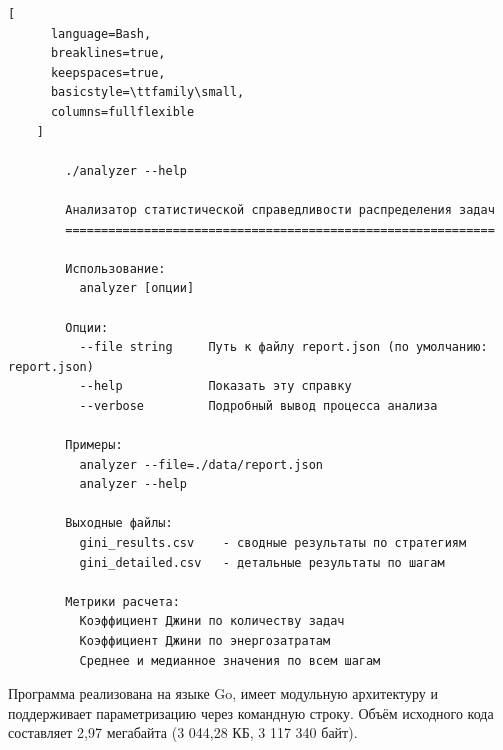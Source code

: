 \begin{ListingEnv}
	\caption{Интерфейс командной строки}\label{lst:shell}
	\begin{lstlisting}[
	  language=Bash,
	  breaklines=true,
	  keepspaces=true,
	  basicstyle=\ttfamily\small,
	  columns=fullflexible
	]

		./analyzer --help

		Анализатор статистической справедливости распределения задач
		============================================================

		Использование:
		  analyzer [опции]

		Опции:
		  --file string     Путь к файлу report.json (по умолчанию: report.json)
		  --help            Показать эту справку
		  --verbose         Подробный вывод процесса анализа

		Примеры:
		  analyzer --file=./data/report.json
		  analyzer --help

		Выходные файлы:
		  gini_results.csv    - сводные результаты по стратегиям
		  gini_detailed.csv   - детальные результаты по шагам

		Метрики расчета:
		  Коэффициент Джини по количеству задач
		  Коэффициент Джини по энергозатратам
		  Среднее и медианное значения по всем шагам
	\end{lstlisting}
\end{ListingEnv}

Программа реализована на языке Go, имеет модульную архитектуру и поддерживает параметризацию через командную строку. Объём исходного кода составляет 2,97 мегабайта (3 044,28 КБ, 3 117 340 байт).

